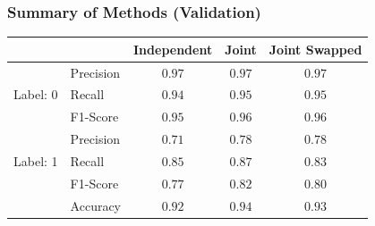 \documentclass[usenames,dvipsnames]{beamer}
\begin{document}
\begin{frame}
  \frametitle{Summary of Methods (Validation)}
  \begin{center}
    \footnotesize

    \begin{tabular}{rlccc}
    \toprule
    {} & {} & Independent & Joint & Joint Swapped \\
    \midrule
    \multirow{3}{*}{Label: 0} & Precision & $\mathbf{0.97}$ & $\mathbf{0.97}$ & $\mathbf{0.97}$ \\
    {}                        & Recall    & $0.94$ & $\mathbf{0.95}$ & $\mathbf{0.95}$ \\
    {}                        & F1-Score  & $0.95$ & $\mathbf{0.96}$ & $\mathbf{0.96}$ \\
    \midrule
    \multirow{3}{*}{Label: 1} & Precision & $0.71$ & $\mathbf{0.78}$ & $\mathbf{0.78}$ \\
    {}                        & Recall    & $0.85$ & $\mathbf{0.87}$ & $0.83$ \\
    {}                        & F1-Score  & $0.77$ & $\mathbf{0.82}$ & $0.80$ \\
    \midrule
    {}                        & Accuracy  & $0.92$ & $\mathbf{0.94}$ & $0.93$ \\
    \bottomrule
    \end{tabular}
  \end{center}
\end{frame}
\end{document}
